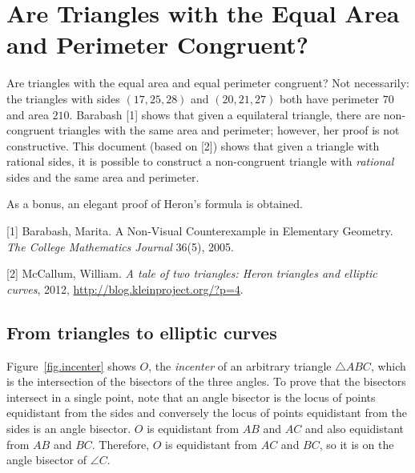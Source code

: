 
\chapter[Are Triangles with the Equal Area and Perimeter Congruent?]{Are Triangles with the Equal Area\\\bigskip and Perimeter Congruent?}\label{c.congruent}


Are triangles with the equal area and equal perimeter congruent? Not necessarily: the triangles with sides $(17,25,28)$ and $(20,21,27)$ both have perimeter $70$ and area $210$. Barabash [1] shows that given a equilateral triangle, there are non-congruent triangles with the same area and perimeter; however, her proof is not constructive. This document (based on [2]) shows that given a triangle with rational sides, it is possible to construct a non-congruent triangle with \emph{rational} sides and the same area and perimeter.

As a bonus, an elegant proof of Heron's formula is obtained.

[1] Barabash, Marita. A Non-Visual Counterexample in Elementary Geometry. \textit{The College Mathematics Journal} 36(5), 2005.

[2] McCallum, William. \textit{A tale of two triangles: Heron triangles and elliptic curves}, 2012, \url{http://blog.kleinproject.org/?p=4}.

\section{From triangles to elliptic curves}

Figure~\ref{fig.incenter} shows $O$, the \emph{incenter} of an arbitrary triangle $\triangle ABC$, which is the intersection of the bisectors of the three angles. To prove that the bisectors intersect in a single point, note that an angle bisector is the locus of points equidistant from the sides and conversely the locus of points equidistant from the sides is an angle bisector. $O$ is equidistant from $AB$ and $AC$ and also equidistant from $AB$ and $BC$. Therefore, $O$ is equidistant from $AC$ and $BC$, so it is on the angle bisector of $\angle C$.

\vspace*{-6ex}

